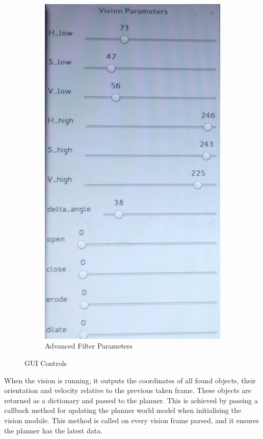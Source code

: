 \begin{figure}[H]
\begin{subfigure}{.5\textwidth}
\includegraphics[scale=0.2]{vision_params}
\caption{Advanced Filter Parameters}
\label{fig:params}
\end{subfigure}
\caption{GUI Controls}
\label{fig:sliders}
\end{figure}


When the vision is running, it outputs the coordinates of all found objects, their orientation and velocity relative to the previous taken frame. These objects are returned as a dictionary and passed to the planner. This is achieved by passing a callback method for updating the planner world model when initialising the vision module. This method is called on every vision frame parsed, and it ensures the planner has the latest data.
